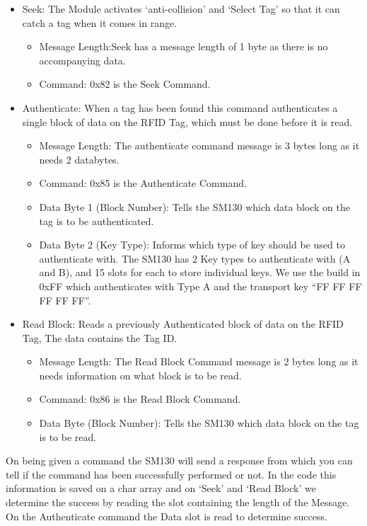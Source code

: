 \begin{itemize}
	\item Seek: The Module activates `anti-collision' and `Select Tag' so that it can catch a tag when it comes in range.
	\begin{itemize}
		\item Message Length:Seek has a message length of 1 byte as there is no accompanying data.
		\item Command: 0x82 is the Seek Command.
	\end{itemize}
	\item Authenticate: When a tag has been found this command authenticates a single block of data on the RFID Tag, which must be done before it is read.
	\begin{itemize}
		\item Message Length: The authenticate command message is 3 bytes long as it needs 2 databytes.
		\item Command: 0x85 is the Authenticate Command.
		\item Data Byte 1 (Block Number): Tells the SM130 which data block on the tag is to be authenticated.
		\item Data Byte 2 (Key Type): Informs which type of key should be used to authenticate with. The SM130 has 2 Key types to authenticate with (A and B), and 15 slots for each to store individual keys. We use the build in 0xFF which authenticates with Type A and the transport key ``FF FF FF FF FF FF''.
	\end{itemize}
	\item Read Block: Reads a previously Authenticated block of data on the RFID Tag, The data contains the Tag ID.
	\begin{itemize}
		\item Message Length: The Read Block Command message is 2 bytes long as it needs information on what block is to be read.
		\item Command: 0x86 is the Read Block Command.
		\item Data Byte (Block Number): Tells the SM130 which data block on the tag is to be read.
	\end{itemize}
\end{itemize}

On being given a command the SM130 will send a response from which you can tell if the command has been successfully performed or not.
In the code this information is saved on a char array and on `Seek' and `Read Block' we determine the success by reading the slot containing the length of the Message.
On the Authenticate command the Data slot is read to determine success.


